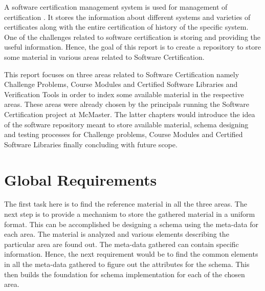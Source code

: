 \documentclass[11pt,letterpaper]{report}
\begin{document}
A software certification management system is used for management of certification \cite{SCMS}. It stores the information about different systems and varieties of certificates along with the entire certification of history of the specific system. One of the challenges related to software certification is storing and providing the useful information. Hence, the goal of this report is to create a repository to store some material in various areas related to Software Certification.

This report focuses on three areas related to Software Certification namely Challenge Problems, Course Modules and Certified Software Libraries and Verification Tools in order to index some available material in the respective areas. These areas were already chosen by the principals running the Software Certification project at McMaster. The latter chapters would introduce the idea of the software repository meant to store available material, schema designing and testing processes for Challenge problems, Course Modules and Certified Software Libraries finally concluding with future scope.

\chapter{Global Requirements}
The first task here is to find the reference material in all the three areas. The next step is to provide a mechanism to store the gathered material in a uniform format. This can be accomplished be designing a schema using the meta-data for each area. The material is analyzed and various elements describing the particular area are found out. The meta-data gathered can contain specific information. Hence, the next requirement would be to find the common elements in all the meta-data gathered to figure out the attributes for the schema. This then builds the foundation for schema implementation for each of the chosen area.\newline
\end{document}
